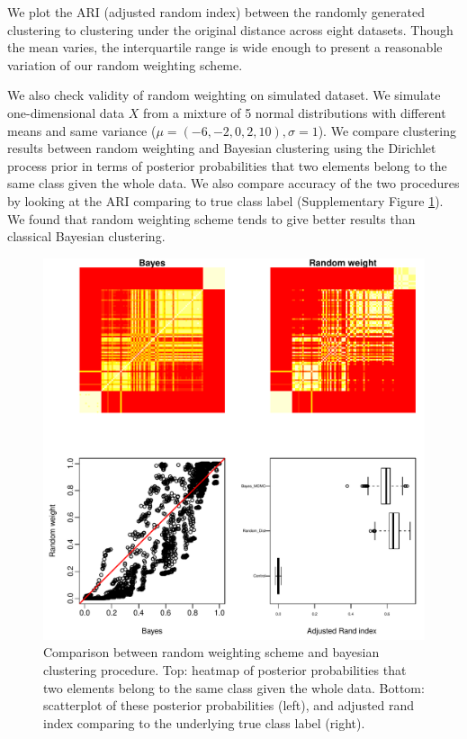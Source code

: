 \documentclass[aoas,preprint]{imsart}
\begin{document}
We plot the ARI (adjusted random index) between the randomly generated clustering to clustering under the original distance across eight datasets. Though the mean varies, the interquartile range is wide enough to present a reasonable variation of our random weighting scheme.

We also check validity of random weighting on simulated dataset. 
We simulate one-dimensional data $X$ from a mixture of 5 normal distributions with different means and same variance ($\mu = (-6,-2,0,2,10), \sigma = 1$). 
We compare clustering results between random weighting and Bayesian clustering using the Dirichlet process prior in terms of posterior probabilities that two elements belong to the same class given the whole data. 
We also compare accuracy of the two procedures by looking at the ARI comparing to true class label (Supplementary Figure \ref{fig:simu}).  
We found that random weighting scheme tends to give better results than classical Bayesian clustering. %

\begin{figure}[h!]
\includegraphics[scale = 0.9]{Figs/try7-g.pdf}
 \caption{Comparison between random weighting scheme and bayesian clustering procedure. 
 Top: heatmap of posterior probabilities that two elements belong to the same class given the whole data. Bottom: scatterplot of these posterior probabilities (left), and adjusted rand index comparing to the underlying true class label (right).}
  \label{fig:simu}
\end{figure}
\end{document}
